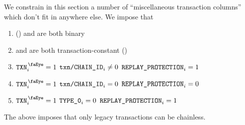 We constrain in this section a number of ``miscellaneous transaction columns'' which don't fit in anywhere else.
We impose that
\begin{enumerate}
    \item \rlpTxnCommonColumnReplayProtection{} (\sanityCheck) and \rlpTxnCommonColumnYparity{} are both binary
    \item \rlpTxnCommonColumnReplayProtection{} and \rlpTxnCommonColumnYparity{} are both transaction-constant (\sanityCheck)
    \item \If $\isTxn _{i} = 1$ \et $\texttt{txn}\texttt{/}\texttt{{CHAIN\_ID}} _{i} \neq 0$ \Then $\texttt{REPLAY\_PROTECTION} _{i} = 1$
    \item \If $\isTxn _{i} = 1$ \et $\texttt{txn}\texttt{/}\texttt{{CHAIN\_ID}} _{i} =    0$ \Then $\texttt{REPLAY\_PROTECTION} _{i} = 0$
    \item \If $\isTxn _{i} = 1$ \et $\texttt{TYPE\_0}                     _{i} =    0$ \Then $\texttt{REPLAY\_PROTECTION} _{i} = 1$
\end{enumerate}
\saNote{} \label{rlp txn: generalities: transaction decoding: non legacy transaction can't be chainless}
The above imposes that only legacy transactions can be chainless.
